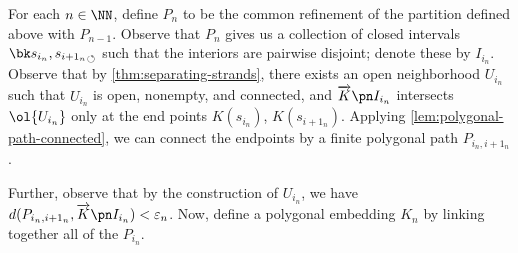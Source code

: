 \begin{sproof}
  For each $n \in \NN$, define $P_n$ to be the common refinement of
  the partition defined above with $P_{n-1}$. Observe that $P_n$ gives
  us a collection of closed intervals $\sbk{s_{i_n}, s_{i+1_n}}$ such
  that the interiors are pairwise disjoint; denote these by $I_{i_n}$.
  Observe that by \cref{thm:separating-strands}, there exists an open
  neighborhood $U_{i_n}$ such that $U_{i_n}$ is open, nonempty, and
  connected, and $\fim{K}{I_{i_n}}$ intersects $\ol{U_{i_n}}$ only at
  the end points $K(s_{i_n})$, $K(s_{i+1_n})$. Applying
  \cref{lem:polygonal-path-connected}, we can connect the endpoints by
  a finite polygonal path $P_{i_n,
    i+1_n}$.

  Further, observe that by the construction of $U_{i_n}$, we have
  $d(P_{i_n, i+1_n}, \fim{K}{I_{i_n}}) < \varepsilon_n$. Now, define a
  polygonal embedding $K_n$ by linking together all of the $P_{i_n}$.


\end{sproof}
